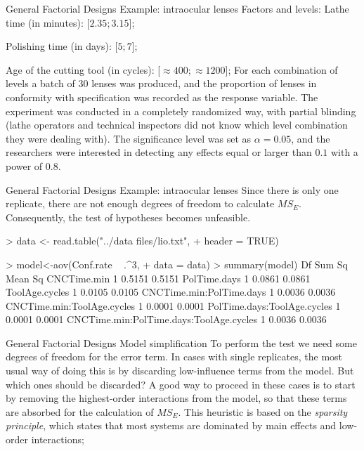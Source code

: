 \documentclass[t]{beamer}
\begin{document}

\begin{ftst}
{General Factorial Designs}
{Example: intraocular lenses}
Factors and levels:
\bitems Lathe time (in minutes): [$2.35; 3.15$];
\item Polishing time (in days): [$5; 7$];
\item Age of the cutting tool (in cycles): [$\approx 400; \approx 1200$];
\eitem
\vhalf
For each combination of levels a batch of 30 lenses was produced, and the proportion of lenses in conformity with specification was recorded  as the response variable.
\vhalf
The experiment was conducted in a completely randomized way, with partial blinding (lathe operators and technical inspectors did not know which level combination they were dealing with). 
\vhalf
The significance level was set as $\alpha=0.05$, and the researchers were interested in detecting any effects equal or larger than $0.1$ with a power of $0.8$.
\end{ftst}


\begin{ftstf}
{General Factorial Designs}
{Example: intraocular lenses}
Since there is only one replicate, there are not enough degrees of freedom to calculate $MS_E$. Consequently, the test of hypotheses becomes unfeasible.

\begin{rcode}
> data <- read.table("../data files/lio.txt",
+                    header = TRUE)

> model<-aov(Conf.rate ~ .^3,
+            data = data)
> summary(model)
                                        Df Sum Sq Mean Sq
CNCTime.min                              1 0.5151  0.5151
PolTime.days                             1 0.0861  0.0861
ToolAge.cycles                           1 0.0105  0.0105
CNCTime.min:PolTime.days                 1 0.0036  0.0036
CNCTime.min:ToolAge.cycles               1 0.0001  0.0001
PolTime.days:ToolAge.cycles              1 0.0001  0.0001
CNCTime.min:PolTime.days:ToolAge.cycles  1 0.0036  0.0036
\end{rcode}
\end{ftstf}


\begin{ftst}
{General Factorial Designs}
{Model simplification}
To perform the test we need some degrees of freedom for the error term. In cases with single replicates, the most usual way of doing this is by discarding low-influence terms from the model. But which ones should be discarded?
\vone
A good way to proceed in these cases is to start by removing the highest-order interactions from the model, so that these terms are absorbed for the calculation of $MS_E$. 
\vone
This heuristic is based on the \textit{sparsity principle}, which states that most systems are dominated by main effects and low-order interactions;
\end{ftst}
\end{document}
